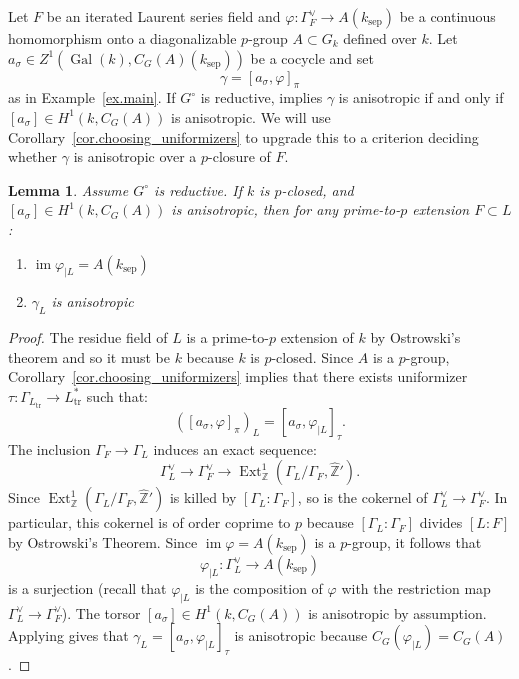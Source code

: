 \documentclass[12pt]{amsart}
\numberwithin{equation}{section}
\newtheorem{lemma}[theorem]{Lemma}
\theoremstyle{definition}
\newcommand{\bZ}{\mathbb{Z}}
\newcommand{\im}{\operatorname{im}}
\newcommand{\Gal}{\operatorname{Gal}}
\newcommand{\sep}{\operatorname{sep}}
\newcommand{\tr}{\operatorname{tr}}
\newcommand{\Ext}{\operatorname{Ext}}
\newcommand{\ksep}{k_{\sep}}
\newcommand{\vphi}{\varphi}
\newcommand{\I}[1]{\Gamma_{#1}^{\vee}}
\begin{document}
Let $F$ be an iterated Laurent series field and $\vphi: \I{F} \to A(\ksep)$ be a continuous homomorphism onto a diagonalizable $p$-group $A\subset G_k$ defined over $k$. Let $a_\sigma \in Z^1(\Gal(k),C_G(A)(\ksep))$ be a cocycle and set
$$\gamma =[a_\sigma,\vphi]_\pi$$
as in Example~\ref{ex.main}. If $G^{\circ}$ is reductive, \cite[Proposition 4.9]{gille2024newloop} implies $\gamma$ is anisotropic if and only if $[a_\sigma]\in H^1(k,C_G(A))$ is anisotropic. We will use Corollary~\ref{cor.choosing_uniformizers} to upgrade this to a criterion deciding whether $\gamma$ is anisotropic over a $p$-closure of $F$.
\begin{lemma}\label{lem.aniso_prime-to-p}
Assume $G^{\circ}$ is reductive.
 If $k$ is $p$-closed, and $[a_\sigma]\in H^1(k,C_G(A))$ is anisotropic, then for any prime-to-$p$ extension $F\subset L$:
 \begin{enumerate}
     \item $\im\vphi_{|L} = A(\ksep)$
     \item $\gamma_L$ is anisotropic
 \end{enumerate}
\end{lemma}
\begin{proof}
    The residue field of $L$ is a prime-to-$p$ extension of $k$  by Ostrowski's theorem and so it must be $k$ because $k$ is $p$-closed.  Since $A$ is a $p$-group, Corollary~\ref{cor.choosing_uniformizers} implies that there exists uniformizer $\tau: \Gamma_{L_{\tr}} \to L_{\tr}^*$ such that:
    $$([a_\sigma,\vphi]_\pi)_L = [a_\sigma,\vphi_{|L}]_\tau.$$
    The inclusion $\Gamma_F \to \Gamma_L$ induces an exact sequence:
    $$\I{L} \to \I{F} \to \Ext^1_{\bZ}(\Gamma_L/\Gamma_F, \hat{\bZ}').$$
    Since $\Ext^1_{\bZ}(\Gamma_L/\Gamma_F,\hat{\bZ}')$ is killed by $[\Gamma_L:\Gamma_F]$, so is the cokernel of $\I{L}\to \I{F}$. In particular, this cokernel is of order coprime to $p$ because $[\Gamma_L:\Gamma_F]$ divides $[L:F]$ by Ostrowski's Theorem.  Since $\im\vphi=A(\ksep)$ is a $p$-group, it follows that $$\vphi_{|L}: \I{L}\to A(\ksep)$$ is a surjection (recall that $\vphi_{|L}$ is the composition of $\vphi$ with the restriction map $\I{L}\to \I{F}$).
    The torsor $[a_\sigma]\in H^1(k,C_G(A))$ is anisotropic by assumption. Applying \cite[Proposition 4.9]{gille2024newloop} gives that $\gamma_L=[a_\sigma,\vphi_{|L}]_\tau$ is anisotropic because $C_{G}(\vphi_{|L}) = C_{G}(A)$.
\end{proof}
\end{document}
